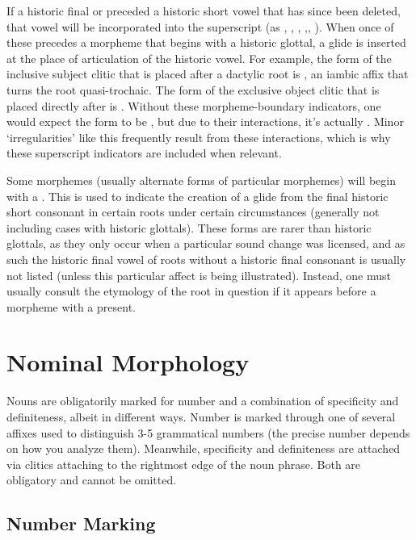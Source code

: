 If a historic final  or \proto{\glotstop} preceded a historic short vowel that has since been deleted, that vowel will be incorporated into the superscript (as \supho{}, \supha{}, \suphi{}, \supgloto{},\supglota{}, \supgloti{}). When once of these precedes a morpheme that begins with a historic glottal, a glide is inserted at the place of articulation of the historic vowel. For example, the form of the inclusive subject clitic that is placed after a dactylic root is , an iambic affix that turns the root quasi-trochaic. The form of the exclusive object clitic that is placed directly after is . Without these morpheme-boundary indicators, one would expect the form to be , but due to their interactions, it's actually . Minor `irregularities' like this frequently result from these interactions, which is why these superscript indicators are included when relevant. 

Some morphemes (usually alternate forms of particular morphemes) will begin with a \supg{}. This is used to indicate the creation of a glide from the final historic short consonant in certain roots under certain circumstances (generally not including cases with historic glottals). These forms are rarer than historic glottals, as they only occur when a particular sound change was licensed, and as such the historic final vowel of roots without a historic final consonant is usually not listed (unless this particular affect is being illustrated). Instead, one must usually consult the etymology of the root in question if it appears before a morpheme with a \supg{} present.

\section{Nominal Morphology}

Nouns are obligatorily marked for number and a combination of specificity and definiteness, albeit in different ways. Number is marked through one of several affixes used to distinguish 3-5 grammatical numbers (the precise number depends on how you analyze them). Meanwhile, specificity and definiteness are attached via clitics attaching to the rightmost edge of the noun phrase. Both are obligatory and cannot be omitted.

\subsection{Number Marking}

